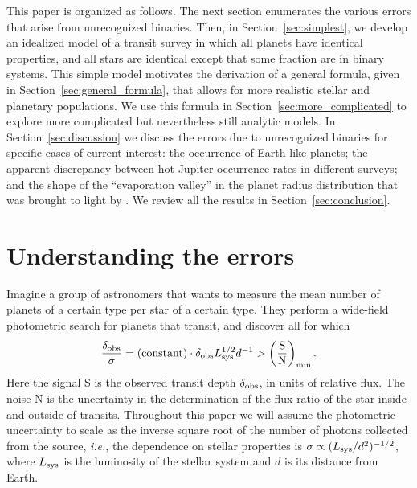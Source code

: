 \documentclass[12pt,modern]{aastex61}
\begin{document}
This paper is organized as follows.  The next section enumerates the
various errors that arise from unrecognized binaries.  Then, in
Section~\ref{sec:simplest}, we develop an idealized model of a transit
survey in which all planets have identical properties, and all stars
are identical except that some fraction are in binary systems.  This
simple model motivates the derivation of a general formula, given in
Section~\ref{sec:general_formula}, that allows for more realistic
stellar and planetary populations.  We use this formula in
Section~\ref{sec:more_complicated} to explore more complicated but
nevertheless still analytic models.  In Section~\ref{sec:discussion}
we discuss the errors due to unrecognized binaries for specific cases
of current interest: the occurrence of Earth-like planets; the
apparent discrepancy between hot Jupiter occurrence rates in different
surveys; and the shape of the ``evaporation valley'' in the planet
radius distribution that was brought to light by
\citet{fulton_california-_2017}.  We review all the results in
Section~\ref{sec:conclusion}.


\section{Understanding the errors}
\label{sec:concept}

Imagine a group of astronomers that wants to measure the mean number of
planets of a certain type per star of a certain type.  They perform a
wide-field photometric search for planets that transit, and discover
all for which
\begin{equation}
\frac{\delta_{\rm obs}}{\sigma}
  = ({\rm constant}) \cdot \delta_{\rm obs} L_{\rm sys}^{1/2} d^{-1}
> \left(\frac{{\rm S}}{{\rm N}}\right)_{\rm min}.
\label{eq:S_N_thresh}
\end{equation}
Here the signal S is the observed transit depth $\delta_{\rm obs}$, in
units of relative flux.
The noise N is the uncertainty in the determination of the flux ratio
of the star inside and outside of transits.  Throughout this paper we
will assume the photometric uncertainty to scale as the inverse square
root of the number of photons collected from the source, {\it i.e.},
the dependence on stellar properties is $\sigma \propto (L_{\rm
sys}/d^2)^{-1/2}$, where $L_{\rm sys}$ is the luminosity of the
stellar system and $d$ is its distance from Earth.
\end{document}
